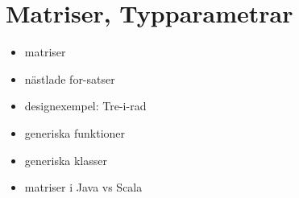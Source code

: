 \chapter{Matriser, Typparametrar}\label{chapter:W09}
\begin{itemize}[nosep]
\item matriser
\item nästlade for-satser
\item designexempel: Tre-i-rad
\item generiska funktioner
\item generiska klasser
\item matriser i Java vs Scala
\end{itemize}